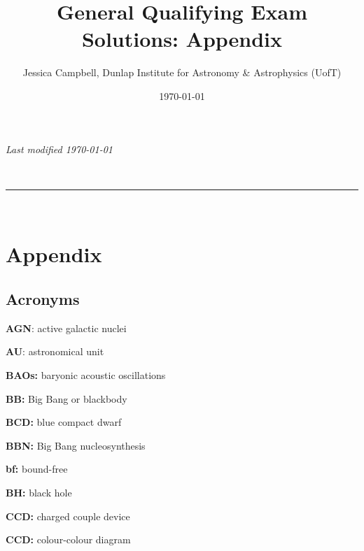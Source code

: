 \documentclass[a4paper,11pt]{article}
\makeatletter
\newcommand{\linia}{\rule{\linewidth}{0.5pt}}
\renewcommand{\maketitle}{
\begin{center}
\vspace{2ex}
{\huge \textsc{\@title}}
\vspace{1ex}
\\
\linia\\
\@author
\vspace{4ex}
\end{center}
}
\makeatother
\begin{document}
\hfill{\textit{Last modified \today}}
\title{General Qualifying Exam Solutions: Appendix}
\author{Jessica Campbell, Dunlap Institute for Astronomy \& Astrophysics (UofT)}
\date{\today}
\maketitle

\tableofcontents


\newpage
\section{Appendix}

\subsection{Acronyms}

{\noindent}\textbf{AGN}: active galactic nuclei

{\noindent}\textbf{AU}: astronomical unit

{\noindent}\textbf{BAOs:} baryonic acoustic oscillations

{\noindent}\textbf{BB:} Big Bang or blackbody

{\noindent}\textbf{BCD:} blue compact dwarf

{\noindent}\textbf{BBN:} Big Bang nucleosynthesis

{\noindent}\textbf{bf:} bound-free

{\noindent}\textbf{BH:} black hole

{\noindent}\textbf{CCD:} charged couple device

{\noindent}\textbf{CCD:} colour-colour diagram
\end{document}
